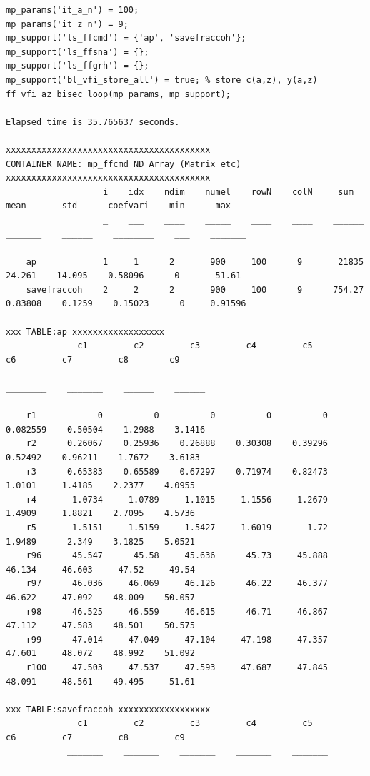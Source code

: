 \documentclass[
]{book}
\begin{document}
\begin{verbatim}
mp_params('it_a_n') = 100;
mp_params('it_z_n') = 9;
mp_support('ls_ffcmd') = {'ap', 'savefraccoh'};
mp_support('ls_ffsna') = {};
mp_support('ls_ffgrh') = {};
mp_support('bl_vfi_store_all') = true; % store c(a,z), y(a,z)
ff_vfi_az_bisec_loop(mp_params, mp_support);

Elapsed time is 35.765637 seconds.
----------------------------------------
xxxxxxxxxxxxxxxxxxxxxxxxxxxxxxxxxxxxxxxx
CONTAINER NAME: mp_ffcmd ND Array (Matrix etc)
xxxxxxxxxxxxxxxxxxxxxxxxxxxxxxxxxxxxxxxx
                   i    idx    ndim    numel    rowN    colN     sum       mean       std      coefvari    min      max  
                   _    ___    ____    _____    ____    ____    ______    _______    ______    ________    ___    _______

    ap             1     1      2       900     100      9       21835     24.261    14.095    0.58096      0       51.61
    savefraccoh    2     2      2       900     100      9      754.27    0.83808    0.1259    0.15023      0     0.91596

xxx TABLE:ap xxxxxxxxxxxxxxxxxx
              c1         c2         c3         c4         c5          c6         c7         c8        c9  
            _______    _______    _______    _______    _______    ________    _______    ______    ______

    r1            0          0          0          0          0    0.082559    0.50504    1.2988    3.1416
    r2      0.26067    0.25936    0.26888    0.30308    0.39296     0.52492    0.96211    1.7672    3.6183
    r3      0.65383    0.65589    0.67297    0.71974    0.82473      1.0101     1.4185    2.2377    4.0955
    r4       1.0734     1.0789     1.1015     1.1556     1.2679      1.4909     1.8821    2.7095    4.5736
    r5       1.5151     1.5159     1.5427     1.6019       1.72      1.9489      2.349    3.1825    5.0521
    r96      45.547      45.58     45.636      45.73     45.888      46.134     46.603     47.52     49.54
    r97      46.036     46.069     46.126      46.22     46.377      46.622     47.092    48.009    50.057
    r98      46.525     46.559     46.615      46.71     46.867      47.112     47.583    48.501    50.575
    r99      47.014     47.049     47.104     47.198     47.357      47.601     48.072    48.992    51.092
    r100     47.503     47.537     47.593     47.687     47.845      48.091     48.561    49.495     51.61

xxx TABLE:savefraccoh xxxxxxxxxxxxxxxxxx
              c1         c2         c3         c4         c5          c6         c7         c8         c9   
            _______    _______    _______    _______    _______    ________    _______    _______    _______


\end{verbatim}
\end{document}
